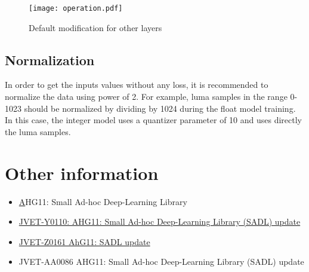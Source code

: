 \documentclass[10pt,a4paper]{article}
\begin{document}
\begin{figure}[p]
\texttt{[image: operation.pdf]}
\caption{Default modification for other layers}\label{opfig}
\end{figure}


\subsection{Normalization}
In order to get the inputs values without any loss, it is recommended to normalize the data using power of 2. For example, luma samples in the range 0-1023 should be normalized by dividing by 1024 during the float model training. In this case, the integer model uses a quantizer parameter of 10 and uses directly the luma samples.


\section{Other information}
\begin{itemize}
\item {\href{https://jvet-experts.org/doc_end_user/documents/23_Teleconference/wg11/JVET-W0181-v5.zip} AHG11: Small Ad-hoc Deep-Learning Library}
\item \href{https://jvet-experts.org/doc_end_user/documents/25_Teleconference/wg11/JVET-Y0110-v3.zip}{JVET-Y0110: AHG11: Small Ad-hoc Deep-Learning Library (SADL) update}
\item \href{https://jvet-experts.org/doc_end_user/documents/26_Teleconference/wg11/JVET-Z0161-v3.zip}{JVET-Z0161 AhG11: SADL update}
\item{JVET-AA0086 AHG11: Small Ad-hoc Deep-Learning Library (SADL) update}

\end{itemize}
\end{document}

